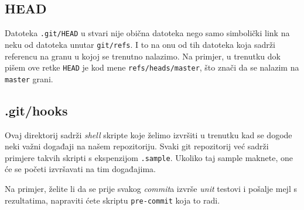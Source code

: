\subsection*{HEAD}

Datoteka \verb+.git/HEAD+ u stvari nije obična datoteka nego samo simbolički link na neku od datoteka unutar \verb+git/refs+.
I to na onu od tih datoteka koja sadrži referencu na granu u kojoj se trenutno nalazimo.
Na primjer, u trenutku dok pišem ove retke \verb+HEAD+ je kod mene \verb+refs/heads/master+, što znači da se nalazim na \verb+master+ grani.

\subsection*{.git/hooks}

Ovaj direktorij sadrži \emph{shell} skripte koje želimo izvršiti u trenutku kad se dogode neki važni događaji na našem repozitoriju.
Svaki git repozitorij već sadrži primjere takvih skripti s ekspenzijom \verb+.sample+.
Ukoliko taj sample maknete, one će se početi izvršavati na tim događajima.

Na primjer, želite li da se prije svakog \emph{commit}a izvrše \emph{unit} testovi i pošalje mejl s rezultatima, napraviti ćete skriptu \verb+pre-commit+ koja to radi.


